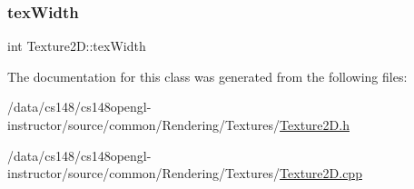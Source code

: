 \subsubsection{\texorpdfstring{tex\+Width}{texWidth}}
{\footnotesize\ttfamily int Texture2\+D\+::tex\+Width\hspace{0.3cm}{\ttfamily [private]}}



The documentation for this class was generated from the following files\+:\begin{DoxyCompactItemize}
\item 
/data/cs148/cs148opengl-\/instructor/source/common/\+Rendering/\+Textures/\hyperlink{_texture2_d_8h}{Texture2\+D.\+h}\item 
/data/cs148/cs148opengl-\/instructor/source/common/\+Rendering/\+Textures/\hyperlink{_texture2_d_8cpp}{Texture2\+D.\+cpp}\end{DoxyCompactItemize}
